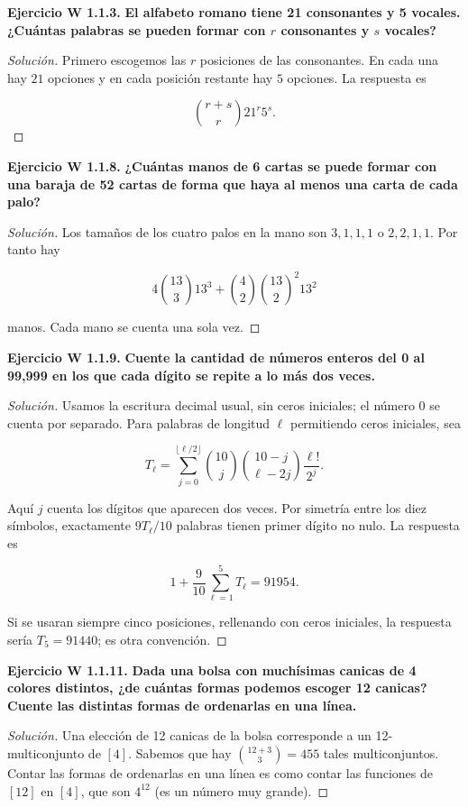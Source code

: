 \medskip\noindent\textbf{Ejercicio W 1.1.3.}
\textbf{El alfabeto romano tiene 21
consonantes y 5 vocales. ¿Cuántas palabras se
pueden formar con $r$ consonantes y $s$
vocales?}
\begin{proof}[Solución]
Primero escogemos las $r$ posiciones de las
consonantes. En cada una hay $21$ opciones y
en cada posición restante hay $5$ opciones.
La respuesta es

$$
{r+s\choose r}21^r5^s.
$$

\end{proof}

\medskip\noindent\textbf{Ejercicio W 1.1.8.}
\textbf{¿Cuántas manos de 6 cartas se puede
formar con una baraja de 52 cartas de forma
que haya al menos una carta de cada palo?}
\begin{proof}[Solución]
Los tamaños de los cuatro palos en la mano
son $3,1,1,1$ o $2,2,1,1$. Por tanto hay

$$
4{13 \choose3}13^3 + {4 \choose2}{13
\choose2}^2 13^2
$$

manos. Cada mano se cuenta una sola vez.
\end{proof}

\medskip\noindent\textbf{Ejercicio W 1.1.9.}
\textbf{Cuente la cantidad de números enteros
del 0 al 99,999 en los que cada dígito se
repite a lo más dos veces.}
\begin{proof}[Solución]
Usamos la escritura decimal usual, sin ceros
iniciales; el número $0$ se cuenta por
separado. Para palabras de longitud $\ell$
permitiendo ceros iniciales, sea

$$
T_\ell=\sum_{j=0}^{\lfloor\ell/2\rfloor}
{10\choose j}{10-j\choose\ell-2j}
\frac{\ell!}{2^j}.
$$

Aquí $j$ cuenta los dígitos que aparecen dos
veces. Por simetría entre los diez símbolos,
exactamente $9T_\ell/10$ palabras tienen
primer dígito no nulo. La respuesta es

$$
1+\frac9{10}\sum_{\ell=1}^{5}T_\ell=91954.
$$

Si se usaran siempre cinco posiciones,
rellenando con ceros iniciales, la respuesta
sería $T_5 = 91440$; es otra convención.
\end{proof}

\medskip\noindent\textbf{Ejercicio W 1.1.11.}
\textbf{Dada una bolsa con muchísimas canicas
de 4 colores distintos, ¿de cuántas formas
podemos escoger 12 canicas? Cuente las
distintas formas de ordenarlas en una línea.}
\begin{proof}[Solución]
Una elección de 12 canicas de la bolsa
corresponde a un 12-multiconjunto de $[4]$.
Sabemos que hay ${12 + 3 \choose3} = 455$
tales multiconjuntos. Contar las formas de
ordenarlas en una línea es como contar las
funciones de $[12]$ en $[4]$, que son
$4^{12}$ (es un número muy grande).
\end{proof}

